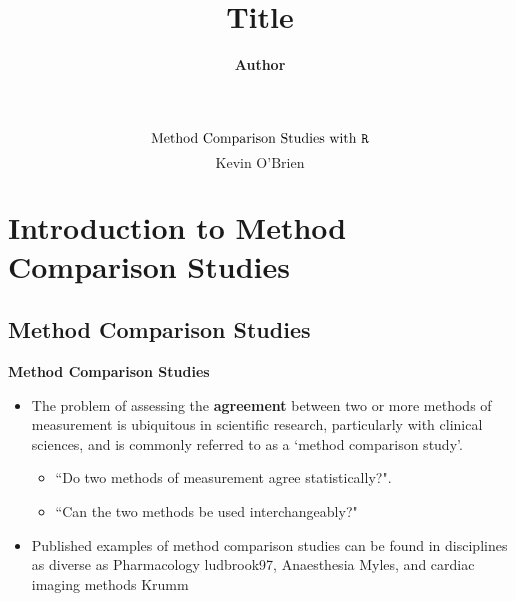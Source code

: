 \documentclass[compress]{beamer}        %
\title
{
{\huge Title\\[0.3cm] }
}
\author[Kevin O'Brien]{{\bf Author}}
\institute[University of Limerick, Maths \& Stats Dept]{}
\date{}
\makeatletter
\newcommand{\tcb}{\textcolor{beamer@blendedblue}}
\makeatother
\begin{document}
\begin{frame}
\huge
\[ \mbox{Method Comparison Studies with \texttt{R}} \]
\Large
\[ \mbox{Kevin O'Brien} \]
\end{frame}
\begin{frame}
\setcounter{tocdepth}{1}
\tableofcontents
\end{frame}

\section[Intro to MCS]{Introduction to Method Comparison Studies}
\subsection{Method Comparison Studies}
\begin{frame}
\large
\vspace{-1cm}
\textbf{Method Comparison Studies}
\begin{itemize}
\item The problem of assessing the \textbf{agreement} between two or more methods
of measurement is ubiquitous in scientific research, particularly with clinical sciences, and is
commonly referred to as a `method comparison study'. 
{
\large
\begin{itemize}
\item ``Do two methods of measurement agree statistically?".
\item ``Can the two methods be used interchangeably?"
\end{itemize}
}

\item Published
examples of method comparison studies can be found in disciplines
as diverse as Pharmacology \alert{ludbrook97}, Anaesthesia
\alert{Myles}, and cardiac imaging methods \alert{Krumm}

\end{itemize}


\end{frame}
\end{document}
